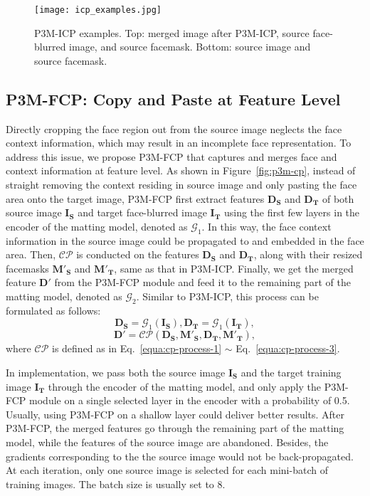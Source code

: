 \documentclass[twocolumn]{svjour3}
\begin{document}
\begin{figure}
    \centering
    \texttt{[image: icp\_examples.jpg]}
    \caption{P3M-ICP examples. Top: merged image after P3M-ICP, source face-blurred image, and source facemask. Bottom: source image and source facemask.}
    \label{fig:data-cp-examples}
\end{figure}



\subsection{P3M-FCP: Copy and Paste at Feature Level}
Directly cropping the face region out from the source image neglects the face context information, which may result in an incomplete face representation. To address this issue, we propose P3M-FCP that captures and merges face and context information at feature level. As shown in Figure~\ref{fig:p3m-cp}, instead of straight removing the context residing in source image and only pasting the face area onto the target image, P3M-FCP first extract features $\mathbf{D_S}$ and $\mathbf{D_T}$ of both source image $\mathbf{I_S}$ and target face-blurred image $\mathbf{I_T}$ using the first few layers in the encoder of the matting model, denoted as $\mathcal{G}_1$. In this way, the face context information in the source image could be propagated to and embedded in the face area. Then, $\mathcal{CP}$ is conducted on the features $\mathbf{D_S}$ and $\mathbf{D_T}$, along with their resized facemasks $\mathbf{M'_S}$ and $\mathbf{M'_T}$, same as that in P3M-ICP. Finally, we get the merged feature $\mathbf{D'}$ from the P3M-FCP module and feed it to the remaining part of the matting model, denoted as $\mathcal{G}_2$. Similar to P3M-ICP, this process can be formulated as follows:
\begin{equation}
    \mathbf{D_S} = \mathcal{G}_1(\mathbf{I_S}), \mathbf{D_T} = \mathcal{G}_1(\mathbf{I_T}),
\label{equa:p3m-fcp-1}
\end{equation}
\begin{equation}
   \mathbf{D'} = \mathcal{CP}(\mathbf{D_S}, \mathbf{M'_S}, \mathbf{D_T}, \mathbf{M'_T}),
\label{equa:p3m-fcp-2}
\end{equation}
where $\mathcal{CP}$ is defined as in Eq.~\ref{equa:cp-process-1} $\sim$ Eq.~\ref{equa:cp-process-3}.

In implementation, we pass both the source image $\mathbf{I_S}$ and the target training image $\mathbf{I_T}$ through the encoder of the matting model, and only apply the P3M-FCP module on a single selected layer in the encoder with a probability of 0.5. 
Usually, using P3M-FCP on a shallow layer could deliver better results. After P3M-FCP, the merged features go through the remaining part of the matting model, while the features of the source image are abandoned. Besides, the gradients corresponding to the the source image would not be back-propagated. At each iteration, only one source image is selected for each mini-batch of training images. The batch size is usually set to 8.
\end{document}
